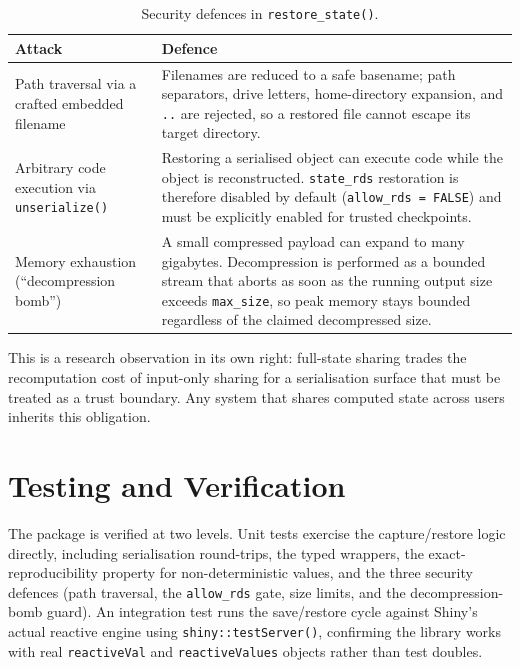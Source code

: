 \documentclass[11pt,a4paper]{article}
\begin{document}
\begin{table}[h]
\centering
\begin{tabularx}{\textwidth}{lX}
\toprule
\textbf{Attack} & \textbf{Defence} \\
\midrule
Path traversal via a crafted embedded filename
  & Filenames are reduced to a safe basename; path separators, drive letters,
    home-directory expansion, and \texttt{..} are rejected, so a restored file
    cannot escape its target directory. \\[4pt]
Arbitrary code execution via \texttt{unserialize()}
  & Restoring a serialised object can execute code while the object is
    reconstructed. \texttt{state\_rds} restoration is therefore disabled by
    default (\texttt{allow\_rds = FALSE}) and must be explicitly enabled for
    trusted checkpoints. \\[4pt]
Memory exhaustion (``decompression bomb'')
  & A small compressed payload can expand to many gigabytes. Decompression is
    performed as a bounded stream that aborts as soon as the running output size
    exceeds \texttt{max\_size}, so peak memory stays bounded regardless of the
    claimed decompressed size. \\
\bottomrule
\end{tabularx}
\caption{Security defences in \texttt{restore\_state()}.}
\end{table}

This is a research observation in its own right: full-state sharing trades the
recomputation cost of input-only sharing for a serialisation surface that must
be treated as a trust boundary. Any system that shares computed state across
users inherits this obligation.

\section{Testing and Verification}
\label{sec:testing}

The package is verified at two levels. Unit tests exercise the capture/restore
logic directly, including serialisation round-trips, the typed wrappers, the
exact-reproducibility property for non-deterministic values, and the three
security defences (path traversal, the \texttt{allow\_rds} gate, size limits, and
the decompression-bomb guard). An integration test runs the save/restore cycle
against Shiny's actual reactive engine using \texttt{shiny::testServer()},
confirming the library works with real \texttt{reactiveVal} and
\texttt{reactiveValues} objects rather than test doubles.
\end{document}
